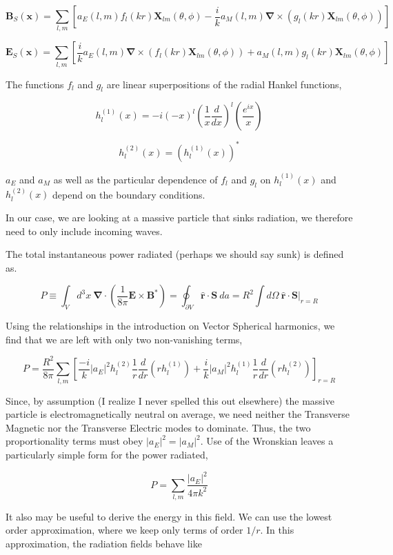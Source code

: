 \documentclass {article}
\renewcommand\vec{\mathbf}
\let\OldS\nabla
\renewcommand{\nabla}{\boldsymbol{\OldS}}
\let\OldHat\hat
\renewcommand{\hat}[1]{\OldHat{\mathbf{#1}}}
\begin{document}
$$\vec B_S (\vec x) = \sum_{l, m} \left[ a_E(l,m)f_l(kr) \vec X_{lm}(\theta , \phi) - \frac i k a_M (l, m) \nabla \times \left(  g_l (kr) \vec X_{lm} (\theta , \phi) \right) \right]$$

$$ \vec E_S (\vec x) = \sum_{l, m} \left[ \frac i k a_E(l,m) \nabla \times  \left( f_l (kr) \vec X_{lm}(\theta, \phi)\right) + a_M(l,m) g_l (kr) \vec X_{lm}(\theta, \phi) \right]$$

The functions $f_l$ and $g_l$ are linear superpositions of the radial Hankel functions,

$$h_l^{(1)}(x) = -i (-x)^l \left(\frac 1 x \frac d {dx} \right)^l \left(\frac {e^{ix}} x \right)$$

$$h_l^{(2)}(x) = \left( h_l^{(1)}(x) \right)^*$$

\noindent $a_E$ and $a_M$ as well as the particular dependence of $f_l$ and $g_l$ on $h_l^{(1)}(x) $ and $h_l^{(2)}(x) $ depend on the boundary conditions.

In our case, we are looking at a massive particle that sinks radiation, we therefore need to only include incoming waves.

The total instantaneous power radiated (perhaps we should say sunk) is defined as.

$$P \equiv \int_V d^3x ~ \nabla \cdot \left( \frac 1 {8 \pi} \vec E \times \vec B^*\right) = \oint_{\partial V} \hat r \cdot \vec S ~ da = R^2 \int d\Omega ~ \hat r \cdot \vec S \bigg|_{r = R}$$

Using the relationships in the introduction on Vector Spherical harmonics, we find that we are left with only two non-vanishing terms,

$$P = \frac {R^2}{8 \pi} \sum_{l, m} \left[  \frac {-i} k |a_E|^2 h_l^{(2)} \frac 1 r \frac d {dr} \left( rh_l^{(1)} \right) + \frac i k |a_M|^2 h_l^{(1)} \frac 1 r \frac d {dr} \left( rh_l^{(2)}\right) \right]_{r=R}$$

Since, by assumption (I realize I never spelled this out elsewhere) the massive particle is electromagnetically neutral on average, we need neither the Transverse Magnetic nor the Transverse Electric modes to dominate. Thus, the two proportionality terms must obey $|a_E|^2 = |a_M|^2$. Use of the Wronskian leaves a particularly simple form for the power radiated,

$$P = \sum_{l,m} \frac {|a_E|^2} { 4 \pi k^2}$$

It also may be useful to derive the energy in this field. We can use the lowest order approximation, where we keep only terms of order $1/r$. In this approximation, the radiation fields behave like
\end{document}
